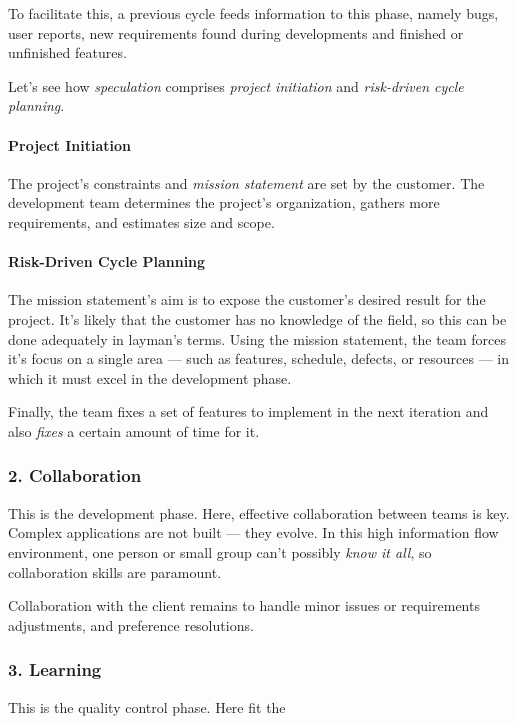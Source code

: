 \documentclass[main.tex]{subfiles}
\begin{document}
To facilitate this, a previous cycle feeds information to this phase, namely bugs, user reports, new requirements found during developments and finished or unfinished features.

Let's see how \emph{speculation} comprises \emph{project initiation} and \emph{risk-driven cycle planning}.

\paragraph{Project Initiation} The project's constraints and \textit{mission statement} are set by the customer. The development team determines the project's organization, gathers more requirements, and estimates size and scope.


\paragraph{Risk-Driven Cycle Planning} The mission statement's aim is to expose the customer's desired result for the project.
It's likely that the customer has no knowledge of the field, so this can be done adequately in layman's terms. Using the mission statement, the team forces it's focus on a single area --- such as features, schedule, defects, or resources --- in which it must excel in the development phase.

Finally, the team fixes a set of features to implement in the next iteration and also \emph{fixes} a certain amount of time for it.

\subsubsection[Collaboration]{2. Collaboration}

This is the development phase. Here, effective collaboration between teams is key. Complex applications are not built --- they evolve. In this high information flow environment, one person or small group can't possibly \textsl{know it all}, so collaboration skills are paramount.

Collaboration with the client remains to handle minor issues or requirements adjustments, and preference resolutions.

\subsubsection[Learning]{3. Learning}

This is the quality control phase. Here fit the 
\end{document}
